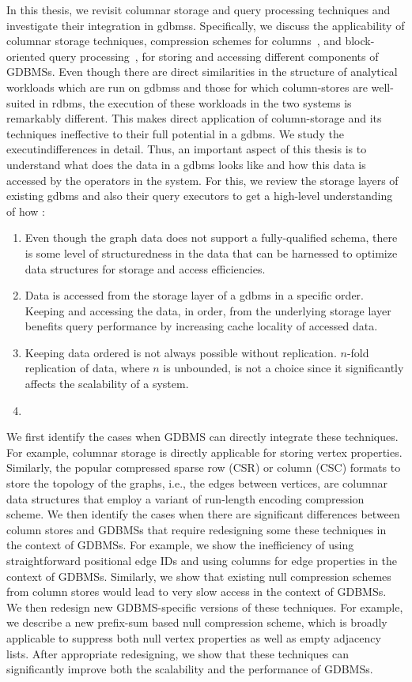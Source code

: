 In this thesis, we revisit columnar storage and query processing techniques and investigate their integration in \gls{gdbms}s. Specifically, we discuss the applicability of columnar storage techniques, compression schemes for columns~\cite{}, and block-oriented query processing~\cite{}, for storing and accessing different components of GDBMSs. Even though there are direct similarities in the structure of analytical workloads which are run on \gls{gdbms}s and those for which column-stores are well-suited in \gls{rdbms}, the execution of these workloads in the two systems is remarkably different. This makes direct application of column-storage and its techniques ineffective to their full potential in a \gls{gdbms}. We study the executindifferences in detail. Thus, an important aspect of this thesis is to understand what does the data in a \gls{gdbms} looks like and how this data is accessed by the operators in the system. For this, we review the storage layers of existing \gls{gdbms} and also their query executors to get a high-level understanding of how :
\begin{enumerate}
	\item Even though the graph data does not support a fully-qualified schema, there is some level of structuredness in the data that can be harnessed to optimize data structures for storage and access efficiencies.
	\item Data is accessed from the storage layer of a \gls{gdbms} in a specific order. Keeping and accessing the data, in order, from the underlying storage layer benefits query performance by increasing cache locality of accessed data.
	\item Keeping data ordered is not always possible without replication. $n$-fold replication of data, where $n$ is unbounded, is not a choice since it significantly affects the scalability of a system.
	\item 
\end{enumerate}

We first identify the cases when GDBMS can directly integrate these techniques. For example, columnar storage is directly applicable for storing vertex properties. Similarly, the popular compressed sparse row (CSR) or column (CSC) formats to store the topology of the graphs, i.e., the edges between vertices, are columnar data structures that employ a variant of run-length encoding compression scheme. We then identify the cases when there are significant differences between column stores and GDBMSs that require redesigning some these techniques in the context of GDBMSs. For example, we show the inefficiency of using straightforward positional edge IDs and using columns for edge properties in the context of GDBMSs. Similarly, we show that existing null compression schemes from column stores would lead to very slow access in the context of GDBMSs. We then redesign new GDBMS-specific versions of these techniques. For example, we describe a new prefix-sum based null compression scheme, which is broadly applicable to suppress both null vertex properties as well as empty adjacency lists. After appropriate redesigning, we show that these techniques can significantly improve both the scalability and the performance of GDBMSs.

